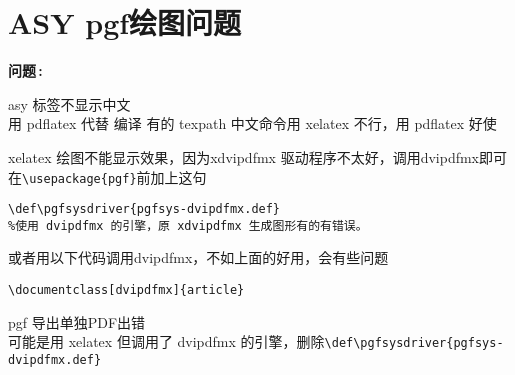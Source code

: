 \section{ASY pgf绘图问题}

\begin{list}
{\bfseries\sffamily 问题\,:\hfill}
{\setlength{\parsep}{\parskip}
 \setlength{\itemsep}{0ex plus0.1ex}
 \setlength{\labelwidth}{4em}
 \setlength{\labelsep}{0.2em}
 \setlength{\leftmargin}{6.2em}
 \setlength{\rightmargin}{2em}
  \setcounter{buzhou_asy}{0}
 \upshape
}

\item \color{red} asy 标签不显示中文 \\ \normalcolor
用 pdflatex 代替 \XeLaTeX 编译 有的 texpath 中文命令用 xelatex 不行，用 pdflatex 好使



\item
\color{red}
xelatex 绘图不能显示效果，因为xdvipdfmx 驱动程序不太好，调用dvipdfmx即可\\
\normalcolor
在\verb|\usepackage{pgf}|前加上这句
\begin{lstlisting}[language={[LaTeX]TeX}]
\def\pgfsysdriver{pgfsys-dvipdfmx.def}
%使用 dvipdfmx 的引擎，原 xdvipdfmx 生成图形有的有错误。
\end{lstlisting}
或者用以下代码调用dvipdfmx，不如上面的好用，会有些问题
\begin{lstlisting}[language={[LaTeX]TeX}]
\documentclass[dvipdfmx]{article}
\end{lstlisting}


\item \color{red} pgf 导出单独PDF出错 \\ \normalcolor
可能是用 xelatex 但调用了 dvipdfmx 的引擎，删除\verb|\def\pgfsysdriver{pgfsys-dvipdfmx.def}|

\end{list}
